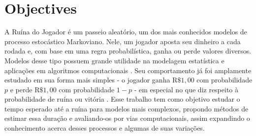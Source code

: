 \documentclass[a4paper,10pt,twocolumn]{article}
\begin{document}
\pagestyle{fancy}
\fancyhead{}
\renewcommand{\headrulewidth}{0pt}


\section{Objectives}

A Ruína do Jogador é um passeio aleatório, um dos mais conhecidos modelos de
processo estocástico Markoviano. Nele, um jogador aposta seu dinheiro a cada
rodada e, com base em uma regra probabilística, ganha ou perde valores diversos.
Modelos desse tipo possuem grande utilidade na modelagem estatística e
aplicações em algoritmos computacionais \cite{ross_markov_2019}. Seu
comportamento já foi amplamente estudado em sua forma mais simples - o jogador
ganha $\mathrm{R}\$1,00$ com probabilidade $p$ e perde $\mathrm{R}\$1,00$ com
probabilidade $1-p$ - em especial no que diz respeito à probabilidade de ruína
ou vitória \cite{ross_introduction_2019}. Esse trabalho tem como objetivo
estudar o tempo esperado até a ruína para modelos mais complexos, propondo
métodos de estimar essa duração e avaliando-os por vias computacionais, assim
expandindo o conhecimento acerca desses processos e algumas de suas variações.
\end{document}
